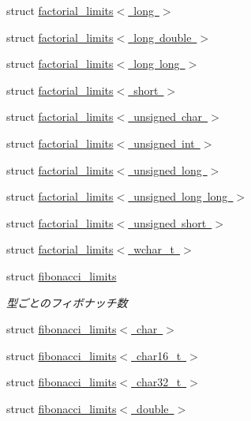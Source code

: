 \begin{DoxyCompactItemize}
\item 
struct \mbox{\hyperlink{structsaki_1_1factorial__limits_3_01long_01_4}{factorial\+\_\+limits$<$ long $>$}}
\item 
struct \mbox{\hyperlink{structsaki_1_1factorial__limits_3_01long_01double_01_4}{factorial\+\_\+limits$<$ long double $>$}}
\item 
struct \mbox{\hyperlink{structsaki_1_1factorial__limits_3_01long_01long_01_4}{factorial\+\_\+limits$<$ long long $>$}}
\item 
struct \mbox{\hyperlink{structsaki_1_1factorial__limits_3_01short_01_4}{factorial\+\_\+limits$<$ short $>$}}
\item 
struct \mbox{\hyperlink{structsaki_1_1factorial__limits_3_01unsigned_01char_01_4}{factorial\+\_\+limits$<$ unsigned char $>$}}
\item 
struct \mbox{\hyperlink{structsaki_1_1factorial__limits_3_01unsigned_01int_01_4}{factorial\+\_\+limits$<$ unsigned int $>$}}
\item 
struct \mbox{\hyperlink{structsaki_1_1factorial__limits_3_01unsigned_01long_01_4}{factorial\+\_\+limits$<$ unsigned long $>$}}
\item 
struct \mbox{\hyperlink{structsaki_1_1factorial__limits_3_01unsigned_01long_01long_01_4}{factorial\+\_\+limits$<$ unsigned long long $>$}}
\item 
struct \mbox{\hyperlink{structsaki_1_1factorial__limits_3_01unsigned_01short_01_4}{factorial\+\_\+limits$<$ unsigned short $>$}}
\item 
struct \mbox{\hyperlink{structsaki_1_1factorial__limits_3_01wchar__t_01_4}{factorial\+\_\+limits$<$ wchar\+\_\+t $>$}}
\item 
struct \mbox{\hyperlink{structsaki_1_1fibonacci__limits}{fibonacci\+\_\+limits}}
\begin{DoxyCompactList}\small\item\em 型ごとのフィボナッチ数 \end{DoxyCompactList}\item 
struct \mbox{\hyperlink{structsaki_1_1fibonacci__limits_3_01char_01_4}{fibonacci\+\_\+limits$<$ char $>$}}
\item 
struct \mbox{\hyperlink{structsaki_1_1fibonacci__limits_3_01char16__t_01_4}{fibonacci\+\_\+limits$<$ char16\+\_\+t $>$}}
\item 
struct \mbox{\hyperlink{structsaki_1_1fibonacci__limits_3_01char32__t_01_4}{fibonacci\+\_\+limits$<$ char32\+\_\+t $>$}}
\item 
struct \mbox{\hyperlink{structsaki_1_1fibonacci__limits_3_01double_01_4}{fibonacci\+\_\+limits$<$ double $>$}}

\end{DoxyCompactItemize}

